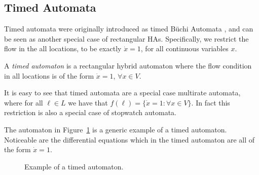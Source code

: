 \subsection{Timed Automata}
Timed automata were originally introduced as timed B\"{u}chi Automata \cite{Alur1990,Alur1994}, and can be seen as another special case of rectangular HAs. Specifically, we restrict the flow in the all locations, to be exactly $\dot{x}=1$, for all continuous variables $x$.

\begin{defi}
A \emph{timed automaton} is a rectangular hybrid automaton where the flow condition in all locations is of the form $\dot{x}=1$, $\forall x\in V$.
\end{defi}

It is easy to see that timed automata are a special case multirate automata, where for all $\ell\in L$ we have that $f(\ell)=\{\dot{x}=1 : \forall x\in V\}$. In fact this restriction is also a special case of stopwatch automata.

\begin{ex}
The automaton in Figure~\ref{fig:extime} is a generic example of a timed automaton. Noticeable are the differential equations which in the timed automaton are all of the form $\dot{x}=1$.

\begin{figure}[H]
    \begin{center}
        \caption{Example of a timed automaton.}
        \label{fig:extime}
    \end{center}
\end{figure}
\end{ex}


